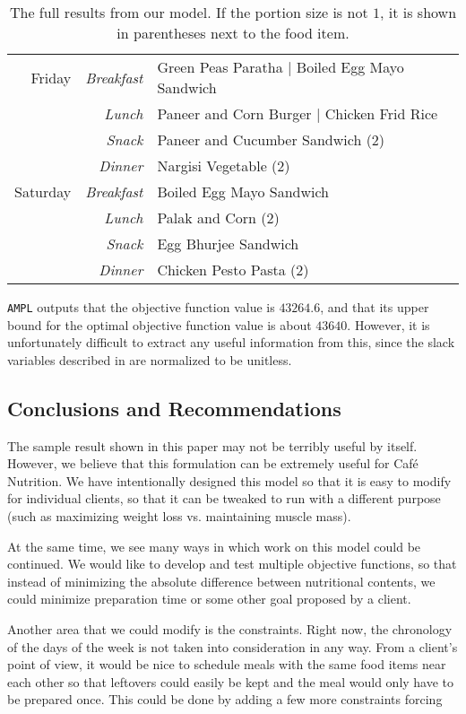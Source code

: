 \documentclass[twoside]{article}
\newcommand{\cn}{Caf\'e Nutrition\xspace}
\newcommand{\codeformat}[1]{\texttt{#1}}
\newcommand{\AMPL}{\codeformat{AMPL}\xspace}
\begin{document}
\begin{table}
\begin{tabular}{rr|l}
        Friday & \textit{Breakfast} & Green Peas Paratha | Boiled Egg Mayo Sandwich\\
        & \textit{Lunch} & Paneer and Corn Burger | Chicken Frid Rice\\
        & \textit{Snack} & Paneer and Cucumber Sandwich (2)\\
        & \textit{Dinner} & Nargisi Vegetable (2)\\
        Saturday & \textit{Breakfast} & Boiled Egg Mayo Sandwich\\
        & \textit{Lunch} & Palak and Corn (2)\\
        & \textit{Snack} & Egg Bhurjee Sandwich\\
        & \textit{Dinner} & Chicken Pesto Pasta (2)
    \end{tabular}
    \caption{The full results from our model. If the portion size is not $1$, it is shown in parentheses next to the food item.}
    \label{tab:full-results}
\end{table}

\AMPL outputs that the objective function value is $43264.6$, and that its upper bound for the optimal objective function value is about $43640$. However, it is unfortunately difficult to extract any useful information from this, since the slack variables described in  are normalized to be unitless.

\subsection{Conclusions and Recommendations}
The sample result shown in this paper may not be terribly useful by itself. However, we believe that this formulation can be extremely useful for \cn. We have intentionally designed this model so that it is easy to modify for individual clients, so that it can be tweaked to run with a different purpose (such as maximizing weight loss vs. maintaining muscle mass).

At the same time, we see many ways in which work on this model could be continued. We would like to develop and test multiple objective functions, so that instead of minimizing the absolute difference between nutritional contents, we could minimize preparation time or some other goal proposed by a client.

Another area that we could modify is the constraints. Right now, the chronology of the days of the week is not taken into consideration in any way. From a client's point of view, it would be nice to schedule meals with the same food items near each other so that leftovers could easily be kept and the meal would only have to be prepared once. This could be done by adding a few more constraints forcing 
\end{document}
